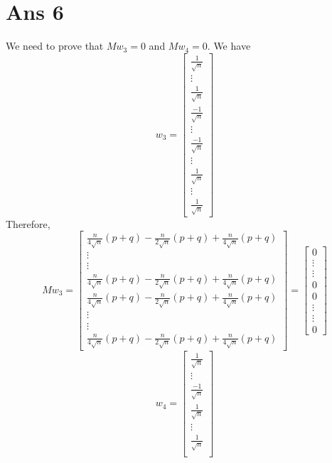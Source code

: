\documentclass[10pt]{article}
\begin{document}
\section*{Ans 6}
\begin{flushleft}
We need to prove that $Mw_{3} = 0$ and $Mw_{4}=0$. We have 
$$ w_{3} = 
\begin{bmatrix}
\frac{1}{\sqrt n}\\
\vdots\\
\frac{1}{\sqrt n}\\
\frac{-1}{\sqrt n}\\
\vdots\\
\frac{-1}{\sqrt n}\\
\vdots\\
\frac{1}{\sqrt n}\\
\vdots\\
\frac{1}{\sqrt n}
\end{bmatrix}
$$
Therefore, \\
$$ Mw_{3} = 
\begin{bmatrix}
\frac{n}{4 \sqrt n} (p+q) - \frac{n}{2 \sqrt n} (p+q) + \frac{n}{4 \sqrt n} (p+q)\\
\vdots\\
\vdots\\
\frac{n}{4 \sqrt n} (p+q) - \frac{n}{2 \sqrt n} (p+q) + \frac{n}{4 \sqrt n} (p+q)\\
\frac{n}{4 \sqrt n} (p+q) - \frac{n}{2 \sqrt n} (p+q) + \frac{n}{4 \sqrt n} (p+q)\\
\vdots\\
\vdots\\
\frac{n}{4 \sqrt n} (p+q) - \frac{n}{2 \sqrt n} (p+q) + \frac{n}{4 \sqrt n} (p+q)
\end{bmatrix}
= \begin{bmatrix}
0\\
\vdots\\
\vdots\\
0\\
0\\
\vdots\\
\vdots\\
0
\end{bmatrix}
$$
$$ w_{4} = 
\begin{bmatrix}
\frac{1}{\sqrt n}\\
\vdots\\
\frac{-1}{\sqrt n}\\
\frac{1}{\sqrt n}\\
\vdots\\
\frac{1}{\sqrt n}\\

\end{bmatrix}$$
\end{flushleft}
\end{document}
